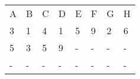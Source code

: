 \begin{tabular}{llllllll}
A & B & C & D & E & F & G & H \\
3 & 1 & 4 & 1 & 5 & 9 & 2 & 6 \\
5 & 3 & 5 & 9 & - & - & - & - \\
- & - & - & - & - & - & - & -
\end{tabular}